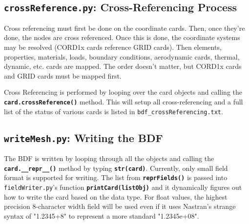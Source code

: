 
 \subsection{{\tt crossReference.py}: Cross-Referencing Process}
     Cross referencing must first be done on the coordinate cards.  Then, once they're done, the nodes are cross referenced.  Once this is done, the coordinate systems may be resolved (CORD1x cards reference GRID cards).  Then elements, properties, materials, loads, boundary conditions, aerodynamic cards, thermal, dynamic, etc. cards are mapped.  The order doesn't matter, but CORD1x cards and GRID cards must be mapped first.
     
     Cross Referencing is performed by looping over the card objects and calling the {\bf \tt card.crossReference()} method.  This will setup all cross-referencing and a full list of the status of various cards is listed in {\tt bdf\_crossReferencing.txt}.

 \subsection{{\tt writeMesh.py}: Writing the BDF}
     The BDF is written by looping through all the objects and calling the {\bf \tt card.\_\_repr\_\_()} method by typing {\bf \tt str(card)}.
     Currently, only small field format is supported for writing.  The list from {\bf \tt reprFields()} is passed into {\tt fieldWriter.py}'s function {\bf \tt printCard(listObj)} and it dynamically figures out how to write the card based on the data type.  For float values, the highest precision 8-character width field will be used even if it uses Nastran's strange syntax of "1.2345+8" to represent a more standard "1.2345e+08".